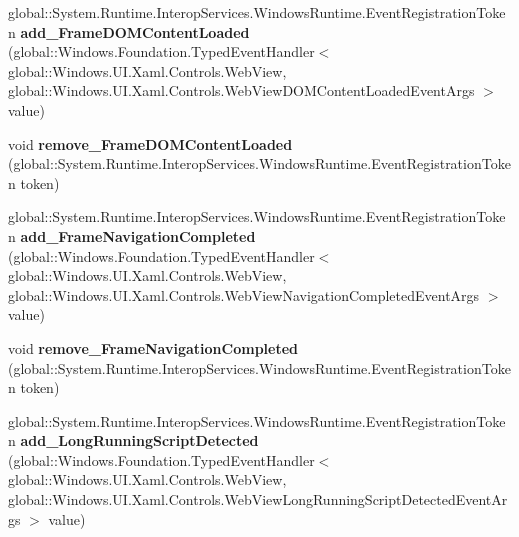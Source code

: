 \begin{DoxyCompactItemize}
\mbox{\label{interface_windows_1_1_u_i_1_1_xaml_1_1_controls_1_1_i_web_view2_a7a047d6e440aef821db8493d115765ab}} 
global\+::\+System.\+Runtime.\+Interop\+Services.\+Windows\+Runtime.\+Event\+Registration\+Token {\bfseries add\+\_\+\+Frame\+D\+O\+M\+Content\+Loaded} (global\+::\+Windows.\+Foundation.\+Typed\+Event\+Handler$<$ global\+::\+Windows.\+U\+I.\+Xaml.\+Controls.\+Web\+View, global\+::\+Windows.\+U\+I.\+Xaml.\+Controls.\+Web\+View\+D\+O\+M\+Content\+Loaded\+Event\+Args $>$ value)
\item 
\mbox{\label{interface_windows_1_1_u_i_1_1_xaml_1_1_controls_1_1_i_web_view2_a9a0644d03c587152ca5463dd2d8dfff8}} 
void {\bfseries remove\+\_\+\+Frame\+D\+O\+M\+Content\+Loaded} (global\+::\+System.\+Runtime.\+Interop\+Services.\+Windows\+Runtime.\+Event\+Registration\+Token token)
\item 
\mbox{\label{interface_windows_1_1_u_i_1_1_xaml_1_1_controls_1_1_i_web_view2_a494bc914cf561ec9468446ccfa74f5e6}} 
global\+::\+System.\+Runtime.\+Interop\+Services.\+Windows\+Runtime.\+Event\+Registration\+Token {\bfseries add\+\_\+\+Frame\+Navigation\+Completed} (global\+::\+Windows.\+Foundation.\+Typed\+Event\+Handler$<$ global\+::\+Windows.\+U\+I.\+Xaml.\+Controls.\+Web\+View, global\+::\+Windows.\+U\+I.\+Xaml.\+Controls.\+Web\+View\+Navigation\+Completed\+Event\+Args $>$ value)
\item 
\mbox{\label{interface_windows_1_1_u_i_1_1_xaml_1_1_controls_1_1_i_web_view2_a63fd5a4351db39afa6abecf66d0cd735}} 
void {\bfseries remove\+\_\+\+Frame\+Navigation\+Completed} (global\+::\+System.\+Runtime.\+Interop\+Services.\+Windows\+Runtime.\+Event\+Registration\+Token token)
\item 
\mbox{\label{interface_windows_1_1_u_i_1_1_xaml_1_1_controls_1_1_i_web_view2_a2b49e3ea316c527b6e25017b9cf4bee5}} 
global\+::\+System.\+Runtime.\+Interop\+Services.\+Windows\+Runtime.\+Event\+Registration\+Token {\bfseries add\+\_\+\+Long\+Running\+Script\+Detected} (global\+::\+Windows.\+Foundation.\+Typed\+Event\+Handler$<$ global\+::\+Windows.\+U\+I.\+Xaml.\+Controls.\+Web\+View, global\+::\+Windows.\+U\+I.\+Xaml.\+Controls.\+Web\+View\+Long\+Running\+Script\+Detected\+Event\+Args $>$ value)

\end{DoxyCompactItemize}
